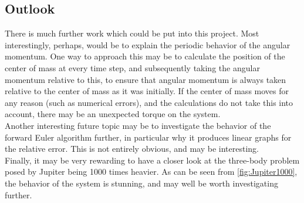 \documentclass[a4paper, 10pt]{article}
\begin{document}
\subsection{Outlook}
There is much further work which could be put into this project. Most interestingly, perhaps, would be to explain the periodic behavior of the angular momentum. One way to approach this may be to calculate the position of the center of mass at every time step, and subsequently taking the angular momentum relative to this, to ensure that angular momentum is always taken relative to the center of mass as it was initially. If the center of mass moves for any reason (such as numerical errors), and the calculations do not take this into account, there may be an unexpected torque on the system.\\
\linebreak
Another interesting future topic may be to investigate the behavior of the forward Euler algorithm further, in particular why it produces linear graphs for the relative error. This is not entirely obvious, and may be interesting.\\
\linebreak
Finally, it may be very rewarding to have a closer look at the three-body problem posed by Jupiter being 1000 times heavier. As can be seen from \cref{fig:Jupiter1000}, the behavior of the system is stunning, and may well be worth investigating further.


\newpage
\end{document}
